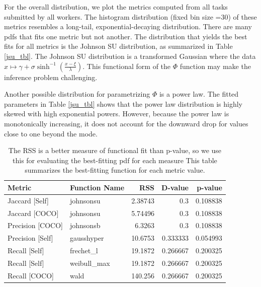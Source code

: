 \documentclass[12pt]{article}
\begin{document}
\par For the overall distribution, we plot the metrics computed from all tasks submitted by all workers. The histogram distribution (fixed bin size =30) of these metrics resembles a long-tail, exponential-decaying distribution. There are many pdfs that fits one metric but not another. The distribution that yields the best fits for all metrics is the Johnson SU distribution, as summarized in Table \ref{jsu_tbl}. The Johnson SU distribution is a transformed Gaussian where the data $x\mapsto\gamma+\sigma \sinh^{-1}(\frac{x-\xi}{\lambda})$. This functional form of the $\Phi$ function may make the inference problem challenging.
\par Another possible distribution for parametrizing $\Phi$ is a power law. The fitted parameters in Table \ref{jsu_tbl} shows that the power law distribution is highly skewed with high exponential powers. However, because the power law is monotonically increasing, it does not account for the downward drop for values close to one beyond the mode.
\begin{table}[h]
\centering
\begin{tabular}{llrrr}
\hline
 Metric           & Function Name   &       RSS &   D-value &   p-value \\
\hline
 Jaccard [Self]   & johnsonsu       &   2.38743 &  0.3      &  0.108838 \\
 Jaccard [COCO]   & johnsonsu       &   5.74496 &  0.3      &  0.108838 \\
 Precision [COCO] & johnsonsb       &   6.3263  &  0.3      &  0.108838 \\
 Precision [Self] & gausshyper      &  10.6753  &  0.333333 &  0.054993 \\
 Recall [Self]    & frechet\_l       &  19.1872  &  0.266667 &  0.200325 \\
 Recall [Self]    & weibull\_max     &  19.1872  &  0.266667 &  0.200325 \\
 Recall [COCO]    & wald            & 140.256   &  0.266667 &  0.200325 \\
\hline
\end{tabular}
\caption{The RSS is a better measure of functional fit than p-value, so we use this for evaluating the best-fitting pdf for each measure This table summarizes the best-fitting function for each metric value.}
\end{table}
\end{document}
